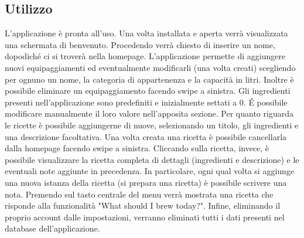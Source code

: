 \documentclass[12pt]{article}
\begin{document}
\subsection{Utilizzo}
L'applicazione è pronta all'uso.\newline
Una volta installata e aperta verrà visualizzata una schermata di benvenuto. Procedendo verrà chiesto di inserire un nome, dopodiché ci si troverà nella homepage.\newline
L'applicazione permette di aggiungere nuovi equipaggiamenti ed eventualmente modificarli (una volta creati) scegliendo per ognuno un nome, la categoria di appartenenza e la capacità in litri. Inoltre è possibile eliminare un equipaggiamento facendo swipe a sinistra.\newline
Gli ingredienti presenti nell'applicazione sono predefiniti e inizialmente settati a 0. É possibile modificare manualmente il loro valore nell'apposita sezione.\newline
Per quanto riguarda le ricette è possibile aggiungerne di nuove, selezionando un titolo, gli ingredienti e una descrizione facoltativa. Una volta creata una ricetta è possibile cancellarla dalla homepage facendo swipe a sinistra. Cliccando sulla ricetta, invece, è possibile visualizzare la ricetta completa di dettagli (ingredienti e descrizione) e le eventuali note aggiunte in precedenza. In particolare, ogni qual volta si aggiunge una nuova istanza della ricetta (si prepara una ricetta) è possibile scrivere una nota.\newline
Premendo sul tasto centrale del menu verrà mostrata una ricetta che risponde alla funzionalità "What should I brew today?".\newline
Infine, eliminando il proprio account dalle impostazioni, verranno eliminati tutti i dati presenti nel database dell'applicazione.



\newpage


\end{document}
